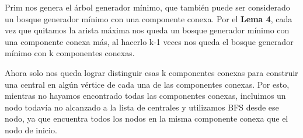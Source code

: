 Prim nos genera el árbol generador mínimo, que también puede ser considerado un bosque generador mínimo con una componente conexa. Por el \textbf{Lema 4}, cada vez que quitamos la arista máxima nos queda un bosque generador mínimo con una componente conexa más, al hacerlo k-1 veces nos queda el bosque generador mínimo con k componentes conexas. 

Ahora solo nos queda lograr distinguir esas k componentes conexas para construir una central en algún vértice de cada una de las componentes conexas. Por esto, mientras no hayamos encontrado todas las componentes conexas, incluimos un nodo todavía no alcanzado a la lista de centrales y utilizamos BFS desde ese nodo, ya que encuentra todos los nodos en la misma componente conexa que el nodo de inicio.
